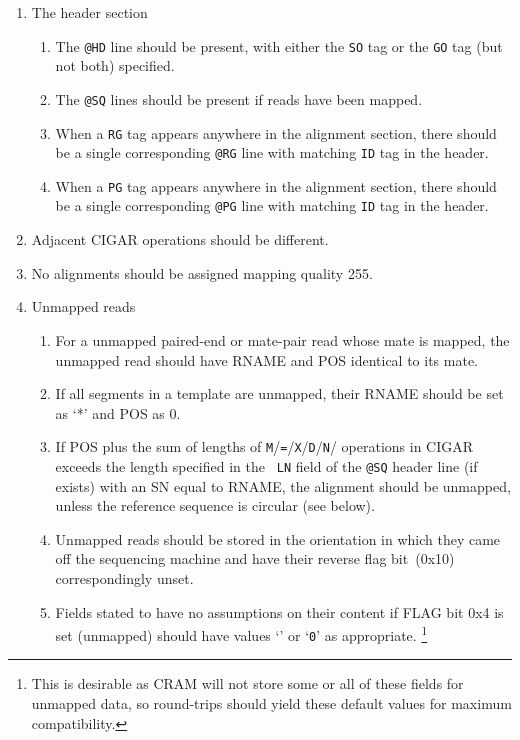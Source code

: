 \documentclass[10pt]{article}
\newcommand*{\cigarops}[1]{\cigaropsAux#1*}
\def\cigaropsAux#1#2*{{\tt #1}\if\relax\detokenize{#2}\relax\else/\cigaropsAux#2*\fi}
\begin{document}
\begin{enumerate}
\item The header section
  \begin{enumerate}[label=\arabic*]
  \item The {\tt @HD} line should be present, with either the {\tt SO} tag
    or the {\tt GO} tag (but not both) specified.
  \item The {\tt @SQ} lines should be present if reads have been mapped.
  \item When a {\tt RG} tag appears anywhere in the alignment section,
    there should be a single corresponding {\tt @RG} line with matching
    {\tt ID} tag in the header.
  \item When a {\tt PG} tag appears anywhere in the alignment section,
    there should be a single corresponding {\tt @PG} line with matching
    {\tt ID} tag in the header.
  \end{enumerate}
\item Adjacent CIGAR operations should be different.
\item No alignments should be assigned mapping quality 255.
\item Unmapped reads
  \begin{enumerate}[label=\arabic*]
  \item For a unmapped paired-end or mate-pair read whose mate is
    mapped, the unmapped read should have {\sf RNAME} and {\sf POS}
    identical to its mate.
  \item If all segments in a template are unmapped, their {\sf RNAME}
    should be set as `*' and {\sf POS} as 0.
  \item If {\sf POS} plus the sum of lengths of \cigarops{M=XDN}
    operations in {\sf CIGAR} exceeds the length specified in the {\tt
      LN} field of the {\tt @SQ} header line (if exists) with an SN
    equal to {\sf RNAME}, the alignment should be unmapped, unless the
    reference sequence is circular (see below).
  \item Unmapped reads should be stored in the orientation in which they came
    off the sequencing machine and have their {\sf reverse} flag bit~(0x10)
    correspondingly unset.
  \item Fields stated to have no assumptions on their content if {\sf FLAG}
      bit 0x4 is set (unmapped) should have values `{\tt *}' or `{\tt 0}' as
      appropriate.
      \footnote{This is desirable as CRAM will not store some or all of these
        fields for unmapped data, so round-trips should yield these default
        values for maximum compatibility.}


\end{enumerate}
\end{enumerate}
\end{document}
